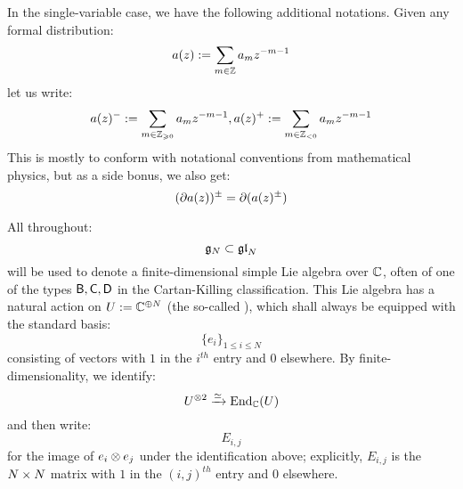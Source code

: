             In the single-variable case, we have the following additional notations. Given any formal distribution:
                $$a(z) := \sum_{m \in \mathbb{Z}} a_m z^{-m - 1}$$
            let us write:
                $$a(z)^- := \sum_{m \in \mathbb{Z}_{\geqslant 0}} a_m z^{-m - 1}, a(z)^+ := \sum_{m \in \mathbb{Z}_{< 0}} a_m z^{-m - 1}$$
            This is mostly to conform with notational conventions from mathematical physics, but as a side bonus, we also get:
                $$(\partial a(z))^{\pm} = \partial( a(z)^{\pm} )$$

            All throughout:
                $$\mathfrak{g}_N \subset \mathfrak{gl}_N$$
            will be used to denote a finite-dimensional simple Lie algebra over $\mathbb{C}$, often of one of the types $\mathsf{B}, \mathsf{C}, \mathsf{D}$ in the Cartan-Killing classification. This Lie algebra has a natural action on $U := \mathbb{C}^{\oplus N}$ (the so-called ), which shall always be equipped with the standard basis:
                $$\{e_i\}_{1 \leq i \leq N}$$
            consisting of vectors with $1$ in the $i^{th}$ entry and $0$ elsewhere. By finite-dimensionality, we identify:
                $$U^{\tensor 2} \xrightarrow[]{\cong} \End_{\bbC}(U)$$
            and then write:
                $$E_{i, j}$$
            for the image of $e_i \tensor e_j$ under the identification above; explicitly, $E_{i, j}$ is the $N \x N$ matrix with $1$ in the $(i, j)^{th}$ entry and $0$ elsewhere.

    

    

    
    
    \printbibliography

